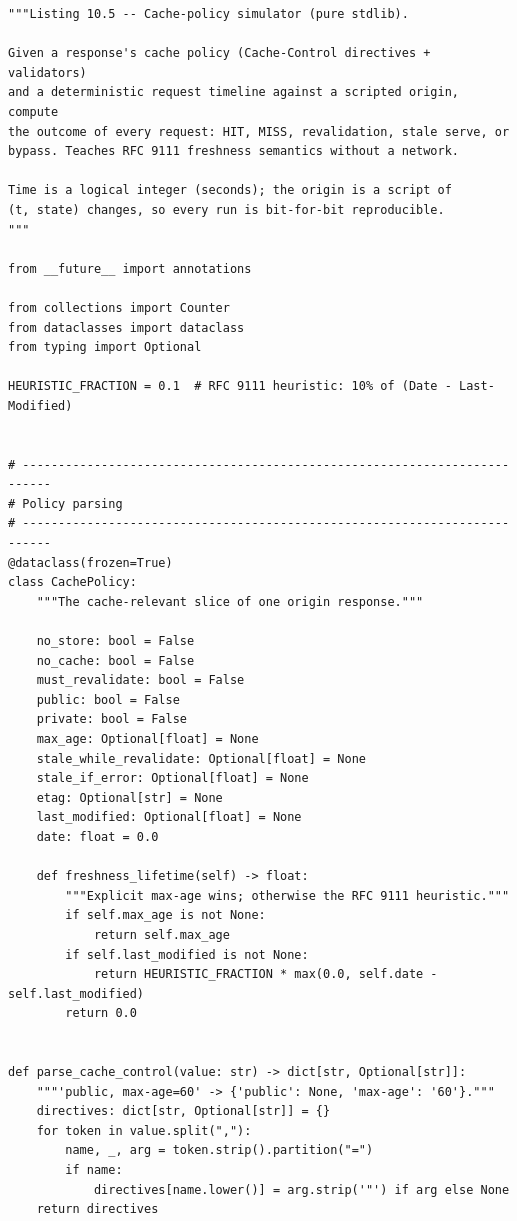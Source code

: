 \begin{verbatim}
"""Listing 10.5 -- Cache-policy simulator (pure stdlib).

Given a response's cache policy (Cache-Control directives + validators)
and a deterministic request timeline against a scripted origin, compute
the outcome of every request: HIT, MISS, revalidation, stale serve, or
bypass. Teaches RFC 9111 freshness semantics without a network.

Time is a logical integer (seconds); the origin is a script of
(t, state) changes, so every run is bit-for-bit reproducible.
"""

from __future__ import annotations

from collections import Counter
from dataclasses import dataclass
from typing import Optional

HEURISTIC_FRACTION = 0.1  # RFC 9111 heuristic: 10% of (Date - Last-Modified)


# --------------------------------------------------------------------------
# Policy parsing
# --------------------------------------------------------------------------
@dataclass(frozen=True)
class CachePolicy:
    """The cache-relevant slice of one origin response."""

    no_store: bool = False
    no_cache: bool = False
    must_revalidate: bool = False
    public: bool = False
    private: bool = False
    max_age: Optional[float] = None
    stale_while_revalidate: Optional[float] = None
    stale_if_error: Optional[float] = None
    etag: Optional[str] = None
    last_modified: Optional[float] = None
    date: float = 0.0

    def freshness_lifetime(self) -> float:
        """Explicit max-age wins; otherwise the RFC 9111 heuristic."""
        if self.max_age is not None:
            return self.max_age
        if self.last_modified is not None:
            return HEURISTIC_FRACTION * max(0.0, self.date - self.last_modified)
        return 0.0


def parse_cache_control(value: str) -> dict[str, Optional[str]]:
    """'public, max-age=60' -> {'public': None, 'max-age': '60'}."""
    directives: dict[str, Optional[str]] = {}
    for token in value.split(","):
        name, _, arg = token.strip().partition("=")
        if name:
            directives[name.lower()] = arg.strip('"') if arg else None
    return directives



\end{verbatim}
